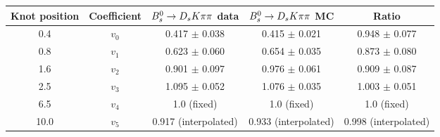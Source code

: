 \begin{tabular}{c c c c c}
\hline
\hline
Knot position & Coefficient & ${{B}^0_{s}}\rightarrow{\ensuremath{{D}_{s}}}{\ensuremath{K}}{\ensuremath{\pi}}{\ensuremath{\pi}}$ data & ${{B}^0_{s}}\rightarrow{\ensuremath{{D}_{s}}}{\ensuremath{K}}{\ensuremath{\pi}}{\ensuremath{\pi}}$ MC & Ratio \\
\hline
0.4 & $v_{0}$ & 0.417 $\pm$ 0.038 & 0.415 $\pm$ 0.021 & 0.948 $\pm$ 0.077\\
0.8 & $v_{1}$ & 0.623 $\pm$ 0.060 & 0.654 $\pm$ 0.035 & 0.873 $\pm$ 0.080\\
1.6 & $v_{2}$ & 0.901 $\pm$ 0.097 & 0.976 $\pm$ 0.061 & 0.909 $\pm$ 0.087\\
2.5 & $v_{3}$ & 1.095 $\pm$ 0.052 & 1.076 $\pm$ 0.035 & 1.003 $\pm$ 0.051\\
6.5 & $v_{4}$ &  1.0 (fixed) & 1.0 (fixed) & 1.0 (fixed)\\
10.0 & $v_{5}$ & 0.917 (interpolated) & 0.933 (interpolated) & 0.998 (interpolated) \\
\hline
\hline
\end{tabular}
